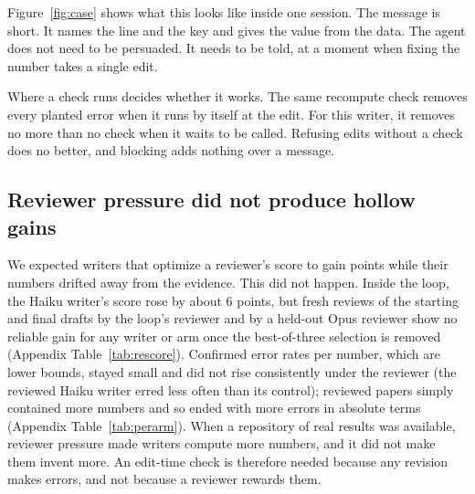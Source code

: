 Figure~\ref{fig:case} shows what this looks like inside one session. The message is short. It names the line and the
key and gives the value from the data. The agent does not need to be persuaded. It needs to be told, at a moment
when fixing the number takes a single edit.

\begin{finding}
Where a check runs decides whether it works. The same recompute check removes every planted error when it runs by
itself at the edit. For this writer, it removes no more than no check when it waits to be called. Refusing edits
without a check does no better, and blocking adds nothing over a message.
\end{finding}



\subsection{Reviewer pressure did not produce hollow gains}

We expected writers that optimize a reviewer's score to gain points while their numbers drifted away from the
evidence. This did not happen. Inside the loop, the Haiku writer's score rose by about 6 points, but fresh reviews of the starting and final
drafts by the loop's reviewer and by a held-out Opus reviewer show no reliable gain for any writer or arm once the
best-of-three selection is removed (Appendix Table~\ref{tab:rescore}). Confirmed error rates per number, which are lower bounds, stayed small and did
not rise consistently under the reviewer (the reviewed Haiku writer erred less often than its control); reviewed papers
simply contained more numbers and so ended with more errors in absolute terms (Appendix Table~\ref{tab:perarm}).
When a repository of real results was available, reviewer pressure made writers compute more numbers, and it did not
make them invent more. An edit-time check is therefore needed because any revision makes errors, and not because a
reviewer rewards them.
